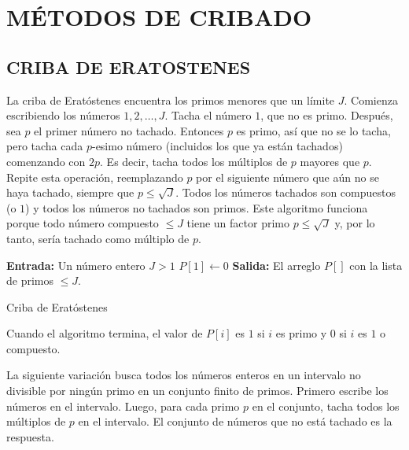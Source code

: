     \section{MÉTODOS DE CRIBADO}
        \subsection{CRIBA DE ERATOSTENES}
        La criba de Eratóstenes encuentra los primos menores que un límite $J$. Comienza escribiendo los números $1, 2, \dots, J$. Tacha el número $1$, que no es primo. Después, sea $p$ el primer número no tachado. Entonces $p$ es primo, así que no se lo tacha, pero tacha cada $p$-esimo número (incluidos los que ya están tachados) comenzando con $2p$. Es decir, tacha todos los múltiplos de $p$ mayores que $p$. Repite esta operación, reemplazando $p$ por el siguiente número que aún no se haya tachado, siempre que $p \leq \sqrt{J}$. Todos los números tachados son compuestos (o $1$) y todos los números no tachados son primos. Este algoritmo funciona porque todo número compuesto $\leq J$ tiene un factor primo $p \leq \sqrt{J}$ y, por lo tanto, sería tachado como múltiplo de $p$. \citep{Eratostenes200}

        \begin{algorithm}[H]
            \SetAlgoLined
            \textbf{Entrada:} Un número entero $J > 1$\;
            $P[1] \leftarrow 0$\;
            \textbf{Salida:} El arreglo $P[]$ con la lista de primos $\leq J$.\ 
            \caption{Criba de Eratóstenes}
        \end{algorithm}

        Cuando el algoritmo termina, el valor de $P[i]$ es $1$ si $i$ es primo y $0$ si $i$ es $1$ o compuesto.

        La siguiente variación busca todos los números enteros en un intervalo no divisible por ningún primo en un conjunto finito de primos. Primero escribe los números en el intervalo. Luego, para cada primo $p$ en el conjunto, tacha todos los múltiplos de $p$ en el intervalo. El conjunto de números que no está tachado es la respuesta.

